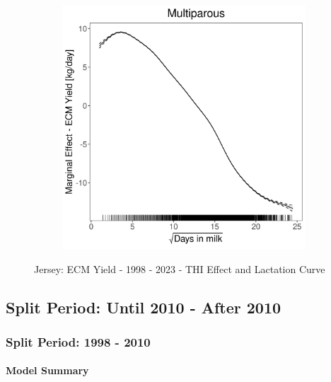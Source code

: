 \begin{figure}[H]
\begin{subfigure}[b]{0.45\textwidth}
    \end{subfigure}
    \hspace{0.05\textwidth} %
    \begin{subfigure}[b]{0.45\textwidth}
        \centering
        \includegraphics[width=\textwidth]{thesis/figures/models/ecm/full/je_ecm_full/je_ecm_full_marginal_dim_milk_multi.png}
    \end{subfigure}
    \caption[]{Jersey: ECM Yield - 1998 - 2023 - THI Effect and Lactation Curve}
    \label{fig:main}
\end{figure}

\subsection{Split Period: Until 2010 - After 2010}
\subsubsection{Split Period: 1998 - 2010}\label{model:je_ecm_before}

\paragraph{Model Summary} \quad \\

